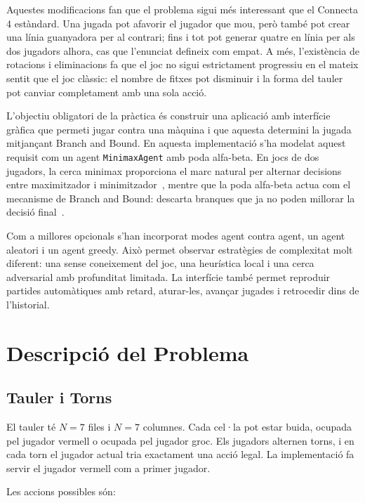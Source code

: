 \documentclass[conference,compsoc]{IEEEtran}
\begin{document}
Aquestes modificacions fan que el problema sigui més interessant que el Connecta
4 estàndard. Una jugada pot afavorir el jugador que mou, però també pot crear una
línia guanyadora per al contrari; fins i tot pot generar quatre en línia per als
dos jugadors alhora, cas que l'enunciat defineix com empat. A més, l'existència
de rotacions i eliminacions fa que el joc no sigui estrictament progressiu en el
mateix sentit que el joc clàssic: el nombre de fitxes pot disminuir i la forma
del tauler pot canviar completament amb una sola acció.

L'objectiu obligatori de la pràctica és construir una aplicació amb interfície
gràfica que permeti jugar contra una màquina i que aquesta determini la jugada
mitjançant Branch and Bound. En aquesta implementació s'ha modelat aquest requisit
com un agent \texttt{MinimaxAgent} amb poda alfa-beta. En jocs de dos jugadors,
la cerca minimax proporciona el marc natural per alternar decisions entre
maximitzador i minimitzador~\cite{ref_gfg_minimax}, mentre que la poda alfa-beta
actua com el mecanisme de Branch and Bound: descarta branques que ja no poden
millorar la decisió final~\cite{ref_gfg_alphabeta}.

Com a millores opcionals s'han incorporat modes agent contra agent, un agent
aleatori i un agent greedy. Això permet observar estratègies de complexitat molt
diferent: una sense coneixement del joc, una heurística local i una cerca
adversarial amb profunditat limitada. La interfície també permet reproduir
partides automàtiques amb retard, aturar-les, avançar jugades i retrocedir dins
de l'historial.

\section{Descripció del Problema}

\subsection{Tauler i Torns}

El tauler té $N=7$ files i $N=7$ columnes. Cada cel·la pot estar buida, ocupada
pel jugador vermell o ocupada pel jugador groc. Els jugadors alternen torns, i en
cada torn el jugador actual tria exactament una acció legal. La implementació fa
servir el jugador vermell com a primer jugador.

Les accions possibles són:
\end{document}
